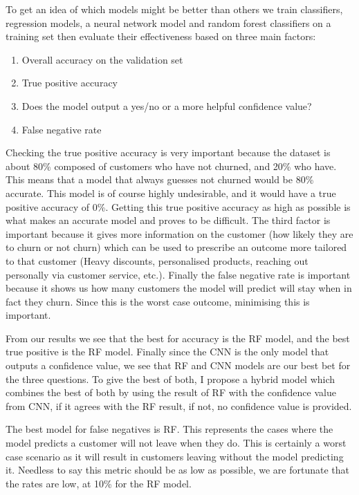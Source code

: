 \documentclass[]{article}
\newcommand{\winningfnrate}{10\%\xspace}
\newcommand{\winningmodelshort}{RF\xspace}
\begin{document}
To get an idea of which models might be better than others we train classifiers, regression models, a neural network model and random forest classifiers on a training set then evaluate their effectiveness based on three main factors:

\begin{enumerate}
	\item Overall accuracy on the validation set
	\item True positive accuracy
	\item Does the model output a yes/no or a more helpful confidence value?
	\item False negative rate
\end{enumerate}

Checking the true positive accuracy is very important because the dataset is about 80\% composed of customers who have not churned, and 20\% who have. This means that a model that always guesses not churned would be 80\% accurate. This model is of course highly undesirable, and it would have a true positive accuracy of 0\%. Getting this true positive accuracy as high as possible is what makes an accurate model and proves to be difficult. The third factor is important because it gives more information on the customer (how likely they are to churn or not churn) which can be used to prescribe an outcome more tailored to that customer (Heavy discounts, personalised products, reaching out personally via customer service, etc.). Finally the false negative rate is important because it shows us how many customers the model will predict will stay when in fact they churn. Since this is the worst case outcome, minimising this is important.

From our results we see that the best for accuracy is the \winningmodelshort model, and the best true positive is the \winningmodelshort model. Finally since the CNN is the only model that outputs a confidence value, we see that \winningmodelshort and CNN models are our best bet for the three questions. To give the best of both, I propose a hybrid model which combines the best of both by using the result of \winningmodelshort with the confidence value from CNN, if it agrees with the \winningmodelshort result, if not, no confidence value is provided.

The best model for false negatives is \winningmodelshort. This represents the cases where the model predicts a customer will not leave when they do. This is certainly a worst case scenario as it will result in customers leaving without the model predicting it. Needless to say this metric should be as low as possible, we are fortunate that the rates are low, at \winningfnrate for the \winningmodelshort model.
\end{document}
